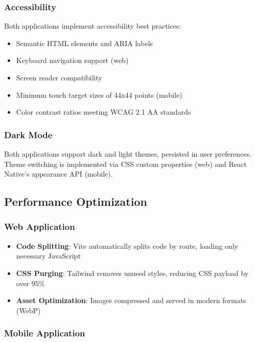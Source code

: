 \subsubsection{Accessibility}

Both applications implement accessibility best practices:

\begin{itemize}
    \item Semantic HTML elements and ARIA labels
    \item Keyboard navigation support (web)
    \item Screen reader compatibility
    \item Minimum touch target sizes of 44x44 points (mobile)
    \item Color contrast ratios meeting WCAG 2.1 AA standards
\end{itemize}

\subsubsection{Dark Mode}

Both applications support dark and light themes, persisted in user preferences. Theme switching is implemented via CSS custom properties (web) and React Native's appearance API (mobile).

\subsection{Performance Optimization}

\subsubsection{Web Application}

\begin{itemize}
    \item \textbf{Code Splitting}: Vite automatically splits code by route, loading only necessary JavaScript
    \item \textbf{CSS Purging}: Tailwind removes unused styles, reducing CSS payload by over 95\%
    \item \textbf{Asset Optimization}: Images compressed and served in modern formats (WebP)
\end{itemize}

\subsubsection{Mobile Application}

